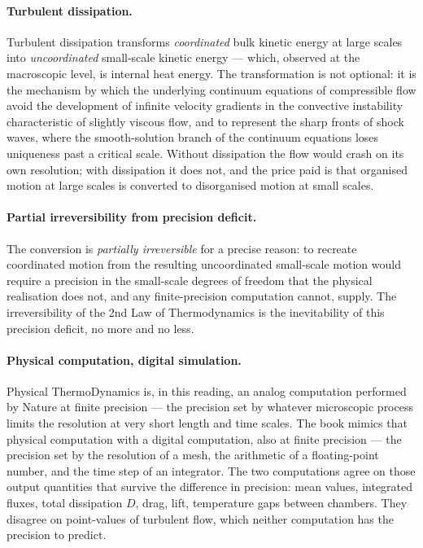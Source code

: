 \paragraph{Turbulent dissipation.}
Turbulent dissipation transforms \emph{coordinated} bulk kinetic
energy at large scales into \emph{uncoordinated} small-scale kinetic
energy --- which, observed at the macroscopic level, is internal
heat energy. The transformation is not optional: it is the mechanism
by which the underlying continuum equations of compressible flow
avoid the development of infinite velocity gradients in the
convective instability characteristic of slightly viscous flow, and
to represent the sharp fronts of shock waves, where the
smooth-solution branch of the continuum equations loses uniqueness
past a critical scale. Without dissipation the flow would crash on
its own resolution; with dissipation it does not, and the price paid
is that organised motion at large scales is converted to disorganised
motion at small scales.

\paragraph{Partial irreversibility from precision deficit.}
The conversion is \emph{partially irreversible} for a precise
reason: to recreate coordinated motion from the resulting
uncoordinated small-scale motion would require a precision in the
small-scale degrees of freedom that the physical realisation does
not, and any finite-precision computation cannot, supply. The
irreversibility of the 2nd Law of Thermodynamics is the inevitability
of this precision deficit, no more and no less.

\paragraph{Physical computation, digital simulation.}
Physical ThermoDynamics is, in this reading, an analog computation
performed by Nature at finite precision --- the precision set by
whatever microscopic process limits the resolution at very short
length and time scales. The book mimics that physical computation
with a digital computation, also at finite precision --- the
precision set by the resolution of a mesh, the arithmetic of a
floating-point number, and the time step of an integrator. The two
computations agree on those output quantities that survive the
difference in precision: mean values, integrated fluxes, total
dissipation $D$, drag, lift, temperature gaps between chambers.
They disagree on point-values of turbulent flow, which neither
computation has the precision to predict.

